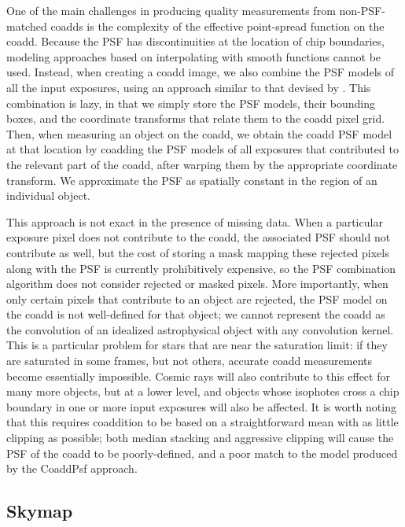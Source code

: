 \documentclass[12pt]{article}
\begin{document}
{%
One of the main challenges in producing quality measurements from
non-PSF-matched coadds is the complexity of the effective point-spread
function on the coadd.  Because the PSF has discontinuities at the
location of chip boundaries, modeling approaches based on
interpolating with smooth functions cannot be used.  Instead, when
creating a coadd image, we also combine the PSF models of all the
input exposures, using an approach similar to that devised by
\cite{JT2011}.  This combination is lazy, in that we simply store the
PSF models, their bounding boxes, and the coordinate transforms that
relate them to the coadd pixel grid.  Then, when measuring an object
on the coadd, we obtain the coadd PSF model at that location by coadding the
PSF models of all exposures that contributed to the relevant part of
the coadd, after warping them by the appropriate coordinate
transform.  We approximate the PSF as spatially constant in the region
of an individual object.

This approach is not exact in the presence of missing data.  When a
particular exposure pixel does not contribute to the coadd, the
associated PSF should not contribute as well, but the cost of storing
a mask mapping these rejected pixels along with the PSF is currently
prohibitively expensive, so the PSF combination algorithm does not
consider rejected or masked pixels.  More importantly, when only
certain pixels that contribute to an object are rejected, the PSF
model on the coadd is not well-defined for that object; we cannot
represent the coadd as the convolution of an idealized astrophysical
object with any convolution kernel.  This is a particular problem for
stars that are near the saturation limit: if they are saturated in
some frames, but not others, accurate coadd measurements become
essentially impossible.  Cosmic rays will also contribute to this
effect for many more objects, but at a lower level, and objects whose
isophotes cross a chip boundary in one or more input exposures will
also be affected.  It is worth
noting that this requires coaddition to be based on a straightforward
mean with as little clipping as possible; both median
stacking and aggressive clipping will cause the PSF of the coadd to be
poorly-defined, and a poor match to the model produced by the CoaddPsf
approach.

\subsection{Skymap}
\label{alg:skymap}

}
\end{document}
